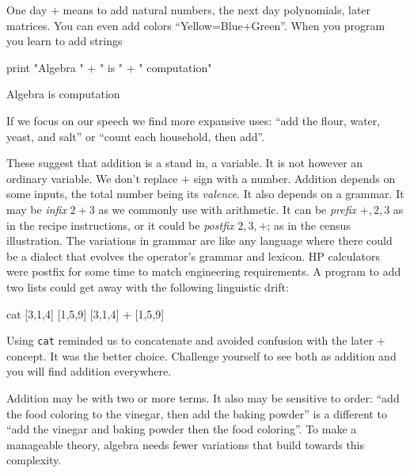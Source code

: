 One day  $+$ means to add natural numbers, the next day 
polynomials, later matrices.  
You can even add colors ``Yellow=Blue+Green''. When you program 
you learn to add strings
\begin{center}
\begin{notebookin}
print "Algebra " + " is " + " computation"
\end{notebookin}
\begin{notebookout}
Algebra is computation
\end{notebookout}
\end{center}
If we focus on our 
speech we find more expansive uses:
``add the flour, water, yeast, and salt'' or  
``count each household, then add''.

These suggest that addition is a stand in, a variable.  It is not however 
an ordinary variable.  We don't replace $+$ sign with a number.  
Addition depends on some inputs, the total 
number being its \emph{valence}.    It also depends on a grammar.
It may be \emph{infix} $2+3$ as we commonly 
use with arithmetic.  It can be \emph{prefix} $+,2,3$ as in the recipe instructions,
or it could be \emph{postfix} $2,3,+$; as in the census illustration.  
The variations in grammar are like any language 
where there could be a dialect that evolves the operator's grammar and lexicon.
 HP calculators were postfix for some time to match engineering requirements.
A program to add two lists could get away with the following linguistic drift:
\begin{center}
\begin{notebookin}
cat [3,1,4] [1,5,9]
[3,1,4] + [1,5,9]
\end{notebookin}
\begin{notebookout}[2]
[3,1,4,1,5,9]
[4,6,13]
\end{notebookout}
\end{center}
Using \texttt{cat} reminded us to concatenate and avoided confusion with the
later $+$ concept.  It was the better choice. Challenge yourself to see both as
addition and you will find addition everywhere. 

Addition  may be with two or more terms.  It also may be 
sensitive to order: ``add the food coloring to the vinegar, then add the baking
powder'' is a different to ``add the vinegar and baking powder then the
food coloring''.  To make a manageable theory, algebra needs fewer variations that 
build towards this complexity.

